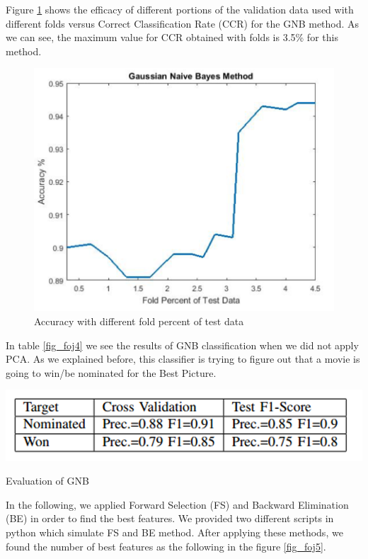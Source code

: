 \documentclass[journal,transmag]{IEEEtran}
\begin{document}
Figure \ref{fig_foj2} shows the efficacy of different portions of the validation data used with different folds versus Correct Classification Rate (CCR) for the GNB method. As we can see, the maximum value for CCR obtained with folds is 3.5\% for this method. 
\begin{figure}
\includegraphics[scale=.38]{figfoj2}
 \caption{Accuracy with different fold percent of test data}
\label{fig_foj2}
\end{figure}

In table \ref{fig_foj4} we see the results of GNB classification when we did not apply PCA. As we explained before, this classifier is trying to figure out that a movie is going to win/be nominated for the Best Picture.

\begin{table}
\includegraphics[scale=.35]{foj4}
 \caption{Evaluation of GNB }
\label{fig_foj4}
\end{table}

In the following, we applied Forward Selection (FS) and Backward Elimination (BE) in order to find the best features. We provided two different scripts in python which simulate FS and BE method. After applying these methods, we found the number of best features as the following in the figure \ref{fig_foj5}.
\end{document}

